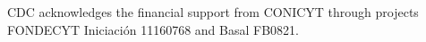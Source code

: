 \documentclass[aps, twocolumn]{revtex4-2}
\begin{document}
\begin{acknowledgments}

CDC acknowledges the financial support from CONICYT through projects FONDECYT Iniciaci\'on 11160768 and Basal FB0821.
\end{acknowledgments}


\end{document}
